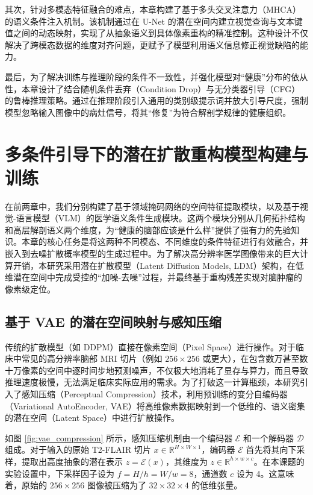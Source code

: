 \documentclass[Win]{xjtuBSThesis}  %
\begin{document}
其次，针对多模态特征融合的难点，本章构建了基于多头交叉注意力（MHCA）的语义条件注入机制。该机制通过在 U-Net 的潜在空间内建立视觉查询与文本键值之间的动态映射，实现了从抽象语义到具体像素重构的精准控制。这种设计不仅解决了跨模态数据的维度对齐问题，更赋予了模型利用语义信息修正视觉缺陷的能力。

最后，为了解决训练与推理阶段的条件不一致性，并强化模型对“健康”分布的依从性，本章设计了结合随机条件丢弃（Condition Drop）与无分类器引导（CFG）的鲁棒推理策略。通过在推理阶段引入通用的类别级提示词并放大引导尺度，强制模型忽略输入图像中的病灶信号，将其“修复”为符合解剖学规律的健康组织。



\section{多条件引导下的潜在扩散重构模型构建与训练}

在前两章中，我们分别构建了基于领域掩码网络的空间特征提取模块，以及基于视觉-语言模型（VLM）的医学语义条件生成模块。这两个模块分别从几何拓扑结构和高层解剖语义两个维度，为“健康的脑部应该是什么样”提供了强有力的先验知识。本章的核心任务是将这两种不同模态、不同维度的条件特征进行有效融合，并嵌入到去噪扩散概率模型的生成过程中。为了解决高分辨率医学图像带来的巨大计算开销，本研究采用潜在扩散模型（Latent Diffusion Models, LDM）架构，在低维潜在空间中完成受控的“加噪-去噪”过程，并最终基于重构残差实现对脑肿瘤的像素级定位。

\subsection{基于 VAE 的潜在空间映射与感知压缩}
\label{subsec:vae_compression}

传统的扩散模型（如 DDPM）直接在像素空间（Pixel Space）进行操作。对于临床中常见的高分辨率脑部 MRI 切片（例如 $256 \times 256$ 或更大），在包含数万甚至数十万像素的空间中逐时间步地预测噪声，不仅极大地消耗了显存与算力，而且导致推理速度极慢，无法满足临床实际应用的需求。为了打破这一计算瓶颈，本研究引入了感知压缩（Perceptual Compression）技术，利用预训练的变分自编码器（Variational AutoEncoder, VAE）将高维像素数据映射到一个低维的、语义密集的潜在空间（Latent Space）中进行扩散操作。

如图 \ref{fig:vae_compression} 所示，感知压缩机制由一个编码器 $\mathcal{E}$ 和一个解码器 $\mathcal{D}$ 组成。对于输入的原始 T2-FLAIR 切片 $x \in \mathbb{R}^{H \times W \times 1}$，编码器 $\mathcal{E}$ 首先将其向下采样，提取出高度抽象的潜在表示 $z = \mathcal{E}(x)$，其维度为 $z \in \mathbb{R}^{h \times w \times c}$。在本课题的实验设置中，下采样因子设为 $f = H/h = W/w = 8$，通道数 $c$ 设为 4。这意味着，原始的 $256 \times 256$ 图像被压缩为了 $32 \times 32 \times 4$ 的低维张量。
\end{document}

